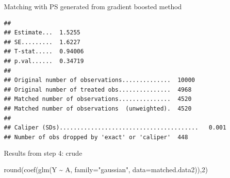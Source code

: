\documentclass[
]{book}
\newenvironment{Shaded}{\begin{snugshade}}{\end{snugshade}}
\newcommand{\AttributeTok}[1]{\textcolor[rgb]{0.77,0.63,0.00}{#1}}
\newcommand{\ConstantTok}[1]{\textcolor[rgb]{0.00,0.00,0.00}{#1}}
\newcommand{\DecValTok}[1]{\textcolor[rgb]{0.00,0.00,0.81}{#1}}
\newcommand{\FloatTok}[1]{\textcolor[rgb]{0.00,0.00,0.81}{#1}}
\newcommand{\FunctionTok}[1]{\textcolor[rgb]{0.00,0.00,0.00}{#1}}
\newcommand{\NormalTok}[1]{#1}
\newcommand{\OtherTok}[1]{\textcolor[rgb]{0.56,0.35,0.01}{#1}}
\newcommand{\SpecialCharTok}[1]{\textcolor[rgb]{0.00,0.00,0.00}{#1}}
\newcommand{\StringTok}[1]{\textcolor[rgb]{0.31,0.60,0.02}{#1}}
\begin{document}
Matching with PS generated from gradient boosted method

\begin{Shaded}
\end{Shaded}

\begin{verbatim}
## 
## Estimate...  1.5255 
## SE.........  1.6227 
## T-stat.....  0.94006 
## p.val......  0.34719 
## 
## Original number of observations..............  10000 
## Original number of treated obs...............  4968 
## Matched number of observations...............  4520 
## Matched number of observations  (unweighted).  4520 
## 
## Caliper (SDs)........................................   0.001 
## Number of obs dropped by 'exact' or 'caliper'  448
\end{verbatim}

\begin{Shaded}
\end{Shaded}

Results from step 4: crude

\begin{Shaded}
\begin{Highlighting}[]
\FunctionTok{round}\NormalTok{(}\FunctionTok{coef}\NormalTok{(}\FunctionTok{glm}\NormalTok{(Y }\SpecialCharTok{\textasciitilde{}}\NormalTok{ A, }\AttributeTok{family=}\StringTok{"gaussian"}\NormalTok{, }\AttributeTok{data=}\NormalTok{matched.data2)),}\DecValTok{2}\NormalTok{)}
\end{Highlighting}
\end{Shaded}
\end{document}
